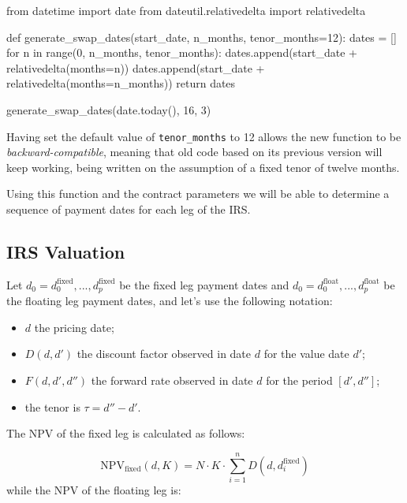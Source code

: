 \begin{ipython}
from datetime import date
from dateutil.relativedelta import relativedelta

def generate_swap_dates(start_date, n_months, tenor_months=12):
    dates = []
    for n in range(0, n_months, tenor_months):
        dates.append(start_date + relativedelta(months=n))
    dates.append(start_date + relativedelta(months=n_months))
    return dates
    
generate_swap_dates(date.today(), 16, 3)
\end{ipython}
\begin{ioutput}
\end{ioutput}
Having set the default value of \texttt{tenor\_months} to 12 allows the new function to be \emph{backward-compatible}, meaning that old code based on its previous version will keep working, being written on the assumption of a fixed tenor of twelve months. 
       
Using this function and the contract parameters we will be able to determine a sequence of payment dates for each leg of the IRS.

\subsection{IRS Valuation}\label{irs-valuation}

Let \(d_0=d_0^{\mathrm{fixed}},...,d_p^{\mathrm{fixed}}\) be the fixed leg payment dates and
\(d_0=d_0^{\mathrm{float}},...,d_p^{\mathrm{float}}\) be the floating leg payment dates, and let's use the following notation:

\begin{itemize}
\tightlist
\item
  \(d\) the pricing date;
\item
  \(D(d, d')\) the discount factor observed in date \(d\) for the value
  date \(d'\);
\item
  \(F(d, d', d'')\) the forward rate observed in date \(d\) for the
  period \([d', d'']\); 
  \item the tenor is \(\tau = d'' - d'\).
\end{itemize}
The NPV of the fixed leg is calculated as follows:

\begin{equation}
\mathrm{NPV}_{\mathrm{fixed}}(d, K) = N\cdot K\cdot\sum_{i=1}^{n}D(d, d_{i}^{\mathrm{fixed}})\end{equation}
while the NPV of the floating leg is:

